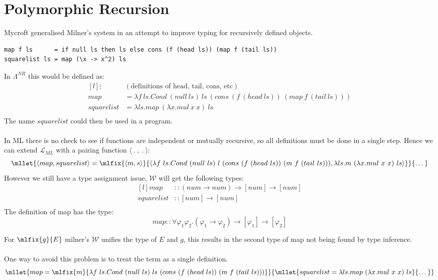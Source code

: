 \section{Polymorphic Recursion}
Mycroft generalised Milner's system in an attempt to improve typing for recursively defined objects.
\begin{verbatim}
map f ls      = if null ls then ls else cons (f (head ls)) (map f (tail ls))
squarelist ls = map (\x -> x^2) ls
\end{verbatim}
In $\Lambda^{NR}$ this would be defined as:
\[\begin{matrix*}[l]
    \vdots & (\text{definitions of head, tail, cons, etc}) \\
    map & = \lambda f \ ls . Cond \ (null \ ls) \ ls \ (cons \ (f \ (head \ ls)) \ (map \ f \ (tail \ ls))) \\
    squarelist & = \lambda ls . map \ (\lambda x . mul \ x \ x) \ ls \\
\end{matrix*}\]
The name $squarelist$ could then be used in a program.
\\
\\ In ML there is no check to see if functions are independent or mutually recursive, so all definitions must be done in a single step. 
Hence we can extend $\mathcal{L}_{ML}$ with a pairing function $\langle \ . \ , \ . \ \rangle$:
\[\mllet{\langle map, squarelist \rangle = \mlfix{\langle m, s \rangle}{\langle \lambda f \ ls . Cond \ (null \ ls) \ l \ (cons \ (f \ (head \ ls)) \ (m \ f \ (tail \ ls))), \lambda ls . m \ (\lambda x . mul \ x \ x) \ ls\rangle}}{\dots}\]
However we still have a type assignment issue, $\mathcal{W}$ will get the following types:
\[\begin{matrix*}[l]
    map & :: (num \to num) \to [num] \to [num] \\
    squarelist & :: [num] \to [num] \\
\end{matrix*}\]
The definition of map has the type:
\[map :: \forall \varphi_1 \varphi_2 . (\varphi_1 \to \varphi_2) \to [\varphi_1] \to [\varphi_2]\]

For $\mlfix{g}{E}$ milner's $\mathcal{W}$ unifies the type of $E$ and $g$, this results in the second type of map not being found by type inference.
\\
\\ One way to avoid this problem is to treat the term as a single definition.
\[\mllet{map = \mlfix{m}{\lambda f \ ls . Cond \ (null \ ls) \ ls \ (cons \ (f \ (head \ ls)) \ (m \ f \ (tail \ ls)))}}{\mllet{squarelist = \lambda ls . map \ (\lambda x . mul \ x \ x) \ ls}{\dots}}\]

